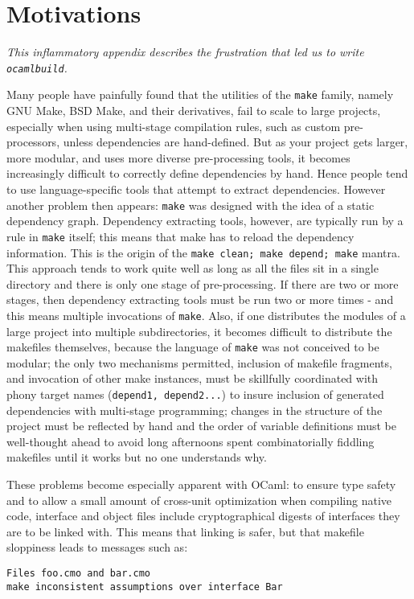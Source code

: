 \documentclass[9pt]{article}
\newcommand{\ocb}{\texttt{ocamlbuild}\xspace}
\begin{document}
\section{Motivations}
{\em This inflammatory appendix describes the frustration that led us to write \ocb.}

Many people have painfully found that the utilities of the \texttt{make}
family, namely GNU Make, BSD Make, and their derivatives, fail to scale to
large projects, especially when using multi-stage compilation rules, such as
custom pre-processors, unless dependencies are hand-defined.  But as your
project gets larger, more modular, and uses more diverse pre-processing tools,
it becomes increasingly difficult to correctly define dependencies by hand.
Hence people tend to use language-specific tools that attempt to extract
dependencies.  However another problem then appears: \texttt{make} was designed
with the idea of a static dependency graph.  Dependency extracting tools,
however, are typically run by a rule in \texttt{make} itself; this means that
make has to reload the dependency information.  This is the origin of the
\texttt{make clean; make depend; make} mantra.  This approach tends to work
quite well as long as all the files sit in a single directory and there is only
one stage of pre-processing.  If there are two or more stages, then dependency
extracting tools must be run two or more times - and this means multiple
invocations of \texttt{make}.  Also, if one distributes the modules of a large
project into multiple subdirectories, it becomes difficult to distribute the
makefiles themselves, because the language of \texttt{make} was not conceived
to be modular; the only two mechanisms permitted, inclusion of makefile
fragments, and invocation of other make instances, must be skillfully
coordinated with phony target names (\texttt{depend1, depend2...}) to insure
inclusion of generated dependencies with multi-stage programming; changes in
the structure of the project must be reflected by hand and the order of
variable definitions must be well-thought ahead to avoid long afternoons spent
combinatorially fiddling makefiles until it works but no one understands why.

These problems become especially apparent with OCaml: to ensure type safety and
to allow a small amount of cross-unit optimization when compiling native code,
interface and object files include cryptographical digests of interfaces they
are to be linked with.  This means that linking is safer, but that makefile sloppiness
leads to messages such as:
\begin{verbatim}
Files foo.cmo and bar.cmo
make inconsistent assumptions over interface Bar
\end{verbatim}
\end{document}
